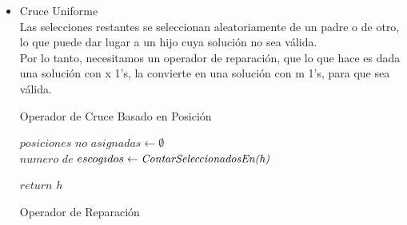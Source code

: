 \documentclass{article}
\begin{document}
\begin{itemize}
\begin{algorithm}[H]
\end{algorithm}

\vspace{3mm}
\item Cruce Uniforme \\
Las selecciones restantes se seleccionan aleatoriamente de un padre o de otro, lo que puede dar
lugar a un hijo cuya solución no sea válida.\\
Por lo tanto, necesitamos un operador de reparación, que lo que hace es dada una solución con 
x 1's, la convierte en una solución con m 1's, para que sea válida.

\begin{algorithm}[H]
  \scriptsize
  \label{Operador de Cruce Basado en Posicion}
  \caption{Operador de Cruce Basado en Posición}
\vspace{3mm}


$posiciones$ $no$ $asignadas \leftarrow \emptyset $\\
$numero$ $de$ $escogidos \leftarrow \emph{ContarSeleccionadosEn(h)} $\\
\vspace{3mm}


$return$ $h $\\

\end{algorithm}



\begin{algorithm}[H]
  \scriptsize
  \label{Operador de Reparacion}
  \caption{Operador de Reparación}
\vspace{3mm}



\end{algorithm}
\end{itemize}
\end{document}
